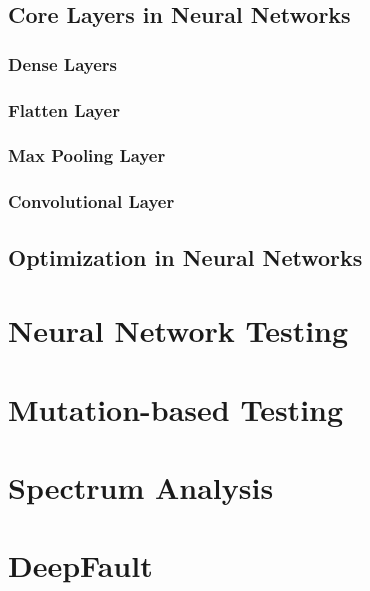 \subsection{Core Layers in Neural Networks}\label{subsec:core-layers-in-neural-networks}
\subsubsection{Dense Layers}
\subsubsection{Flatten Layer}
\subsubsection{Max Pooling Layer}
\subsubsection{Convolutional Layer}
\subsection{Optimization in Neural Networks}\label{subsec:optimization-in-neural-networks}
\section{Neural Network Testing}\label{sec:neural-network-testing}
\lipsum[21-25]
\section{Mutation-based Testing}\label{sec:mutation-based-testing}
\lipsum[26-30]
\section{Spectrum Analysis}\label{sec:spectrum-analysis}
\lipsum[31-35]
\section{DeepFault}\label{sec:deepfault}\cite{wong_dstar_2014}
\lipsum[36-40]
